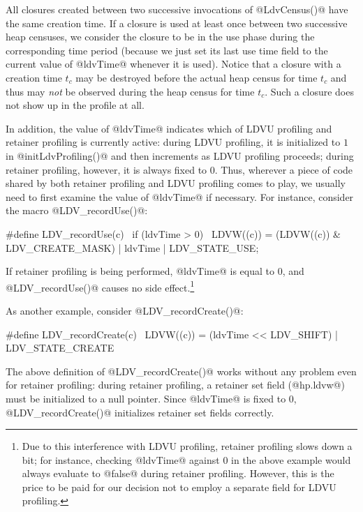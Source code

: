\documentclass{article}
\begin{document}
All closures created between two successive invocations of
@LdvCensus()@ have the same creation time.  If a closure is used at
least once between two successive heap censuses, we consider the
closure to be in the use phase during the corresponding time period
(because we just set its last use time field to the current value of
@ldvTime@ whenever it is used).  Notice that a closure with a creation
time $t_c$ may be destroyed before the actual heap census for time
$t_c$ and thus may \emph{not} be observed during the heap census for
time $t_c$.  Such a closure does not show up in the profile at all.

In addition, the value of @ldvTime@ indicates which of LDVU profiling
and retainer profiling is currently active: during LDVU profiling, it
is initialized to $1$ in @initLdvProfiling()@ and then increments as
LDVU profiling proceeds; during retainer profiling, however, it is
always fixed to $0$.  Thus, wherever a piece of code shared by both
retainer profiling and LDVU profiling comes to play, we usually need
to first examine the value of @ldvTime@ if necessary. For instance,
consider the macro @LDV_recordUse()@:

\begin{code}
#define LDV_recordUse(c)                              \
  if (ldvTime > 0)                                    \
    LDVW((c)) = (LDVW((c)) & LDV_CREATE_MASK) | ldvTime | LDV_STATE_USE; 
\end{code}

If retainer profiling is being performed, @ldvTime@ is equal to $0$,
and @LDV_recordUse()@ causes no side effect.\footnote{Due to this
interference with LDVU profiling, retainer profiling slows down a bit;
for instance, checking @ldvTime@ against $0$ in the above example
would always evaluate to @false@ during retainer profiling.
However, this is the price to be paid for our decision not to employ a
separate field for LDVU profiling.}

As another example, consider @LDV_recordCreate()@:

\begin{code}
#define LDV_recordCreate(c)   \
  LDVW((c)) = (ldvTime << LDV_SHIFT) | LDV_STATE_CREATE
\end{code}

The above definition of @LDV_recordCreate()@ works without any problem
even for retainer profiling: during retainer profiling, 
a retainer set field (@hp.ldvw@) must be initialized to a null pointer.
Since @ldvTime@ is fixed to $0$, @LDV_recordCreate()@ initializes 
retainer set fields correctly.
\end{document}
